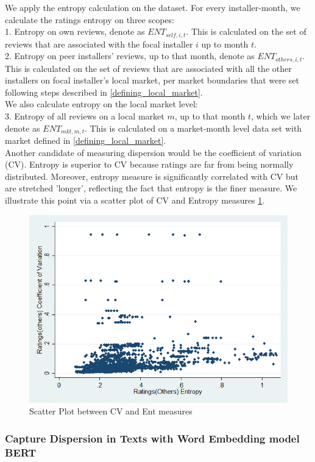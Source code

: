 \documentclass[msom,blindrev]{informs3}
\begin{document}
We apply the entropy calculation on the dataset. For every installer-month, we calculate the ratings entropy on three scopes: \\
1. Entropy on own reviews, denote as $ENT_{self,i,t}$. This is calculated on the set of reviews that are associated with the focal installer $i$ up to month $t$.  \\ 
2. Entropy on peer installers' reviews, up to that month, denote as $ENT_{others,i,t}$. This is calculated on the set of reviews that are associated with all the other installers on focal installer's local market, per market boundaries that were set following steps described in \ref{defining_local_market}.  \\
We also calculate entropy on the local market level:\\
3. Entropy of all reviews on a local market $m$, up to that month $t$, which we later denote as $ENT_{mkt,m,t}$. This is calculated on a market-month level data set with market defined in \ref{defining_local_market}. \\
Another candidate of measuring dispersion would be the coefficient of variation (CV). Entropy is superior to CV because ratings are far from being normally distributed. Moreover, entropy measure is significantly correlated with CV but are stretched 'longer', reflecting the fact that entropy is the finer measure. We illustrate this point via a scatter plot of CV and Entropy measures \ref{scatter_cv_ent_others}. 
\begin{figure}
	\centering
	\includegraphics[width=0.7\linewidth]{scatter_cv_ent_others.png}
	\caption{Scatter Plot between CV and Ent measures}
	\label{scatter_cv_ent_others}
\end{figure}  

\subsubsection{Capture Dispersion in Texts with Word Embedding model BERT}
\end{document}
